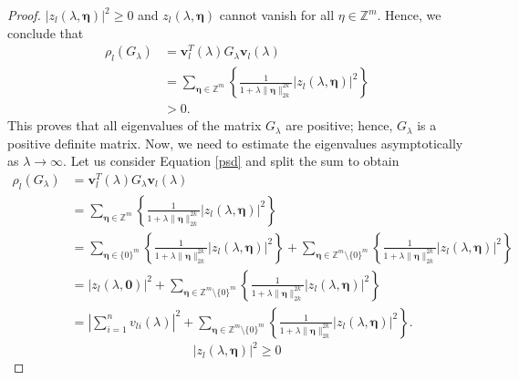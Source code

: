\documentclass[10pt,a4paper]{amsart}
\begin{document}
\begin{proof}
$\left|z_l(\lambda,\boldsymbol{\eta})\right|^2 \ge 0$ and $z_l(\lambda,\boldsymbol{\eta})$ cannot vanish for all $\eta\in\mathbb{Z}^m$. Hence, we conclude that
\begin{equation}\label{psd}
\begin{aligned}
   \rho_l(G_{\lambda}) &= \boldsymbol{v}_l^T(\lambda)G_{\lambda}\boldsymbol{v}_l(\lambda)\\
        &= \sum_{\boldsymbol{\eta}\in\mathbb{Z}^m}\left\{ \frac{1}{1+\lambda\|\boldsymbol{\eta}\|_{2k}^{2k}}\left|z_l(\lambda,\boldsymbol{\eta})\right|^2 \right\}\\
        &> 0.
\end{aligned}
\end{equation}
This proves that all eigenvalues of the matrix $G_{\lambda}$ are positive; hence, $G_{\lambda}$ is a positive definite matrix. Now, we need to estimate the eigenvalues asymptotically as $\lambda\to\infty$. Let us consider Equation \ref{psd} and split the sum to obtain
\begin{equation}\label{psd2}
\begin{aligned}
   \rho_l(G_{\lambda}) &= \boldsymbol{v}_l^T(\lambda)G_{\lambda}\boldsymbol{v}_l(\lambda)\\
        &= \sum_{\boldsymbol{\eta}\in\mathbb{Z}^m}\left\{ \frac{1}{1+\lambda\|\boldsymbol{\eta}\|_{2k}^{2k}}\left|z_l(\lambda,\boldsymbol{\eta})\right|^2 \right\}\\
            &= \sum_{\boldsymbol{\eta}\in\{0\}^m}\left\{ \frac{1}{1+\lambda\|\boldsymbol{\eta}\|_{2k}^{2k}}\left|z_l(\lambda,\boldsymbol{\eta})\right|^2 \right\} + \sum_{\boldsymbol{\eta}\in\mathbb{Z}^m\setminus\{0\}^m}\left\{ \frac{1}{1+\lambda\|\boldsymbol{\eta}\|_{2k}^{2k}}\left|z_l(\lambda,\boldsymbol{\eta})\right|^2 \right\}\\
            &= \left|z_l(\lambda,\boldsymbol{0})\right|^2 + \sum_{\boldsymbol{\eta}\in\mathbb{Z}^m\setminus\{0\}^m}\left\{ \frac{1}{1+\lambda\|\boldsymbol{\eta}\|_{2k}^{2k}}\left|z_l(\lambda,\boldsymbol{\eta})\right|^2 \right\}\\
        &= \left|\sum\limits_{i=1}^nv_{li}(\lambda)\right| ^2 + \sum_{\boldsymbol{\eta}\in\mathbb{Z}^m\setminus\{0\}^m}\left\{ \frac{1}{1+\lambda\|\boldsymbol{\eta}\|_{2k}^{2k}}\left|z_l(\lambda,\boldsymbol{\eta})\right|^2 \right\}.   
\end{aligned}
\end{equation}
\begin{equation}\label{seq_1}
 \left|z_l(\lambda,\boldsymbol{\eta})\right|^2 \ge 0
 \end{equation}\begin{equation}\label{proof_lambda}

\end{equation}
\end{proof}
\end{document}

